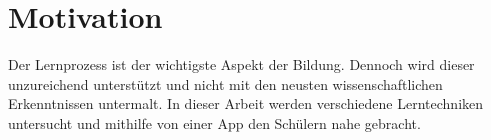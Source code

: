 \setcounter{page}{3}
\chapter{Motivation} %
Der Lernprozess ist der wichtigste Aspekt der Bildung. Dennoch wird dieser
unzureichend unterstützt und nicht mit den neusten wissenschaftlichen Erkenntnissen
untermalt. In dieser Arbeit werden verschiedene Lerntechniken untersucht und mithilfe
von einer App den Schülern nahe gebracht.
